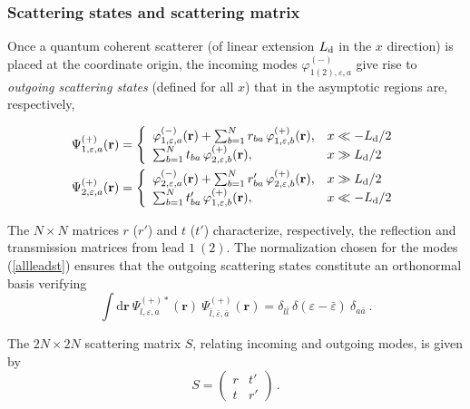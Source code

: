 \documentclass[a4paper,10pt]{article}
\newcommand{\br}{\mathbf{r}}
\newcommand{\dif}{\mathrm{d}}
\newcommand{\nin}{\noindent}
\begin{document}
\subsubsection{Scattering states and scattering matrix}

Once a quantum coherent scatterer (of linear extension $L_{\rm d}$ in the $x$ direction) is placed at the coordinate origin, the incoming modes 
$\varphi_{1(2),\varepsilon,a}^{(-)}$ give rise to {\it outgoing scattering states} (defined for all $x$) that in the asymptotic regions are, respectively,

\begin{subequations}\label{allscats}
\begin{align}
\Psi_{1,\varepsilon,a}^{(+)}(\br) 
&= 
\left\lbrace 
\begin{array}{ll}
\varphi_{1,\varepsilon,a}^{(-)}(\br) + \sum_{b=1}^{N} r_{ba} \, \varphi_{1,\varepsilon,b}^{(+)}(\br),
 & x \ll -L_{\rm d}/2 \\
\sum_{b=1}^{N} t_{ba} \, \varphi_{2,\varepsilon,b}^{(+)}(\br), & x \gg L_{\rm d}/2  
\end{array} 
\right. \label{scatst1} 
\\
\Psi_{2,\varepsilon,a}^{(+)}(\br) 
&= 
\left\lbrace 
\begin{array}{ll}
\varphi_{2,\varepsilon,a}^{(-)}(\br) + \sum_{b=1}^{N} r^{\prime}_{ba} \, 
\varphi_{2,\varepsilon,b}^{(+)}(\br), & x \gg L_{\rm d}/2 \\
\sum_{b=1}^{N} t^{\prime}_{ba} \, \varphi_{1,\varepsilon,b}^{(+)}(\br), & x \ll -L_{\rm d}/2 
\end{array} 
\right. \label{scatst2} 
\end{align}
\end{subequations}

\nin The $N \times N$ matrices $r$ ($r'$) and $t$ ($t'$) characterize, respectively, the reflection and transmission matrices from lead $1\ (2)$.  The normalization chosen for the modes (\ref{allleadst}) ensures that the outgoing scattering states constitute an orthonormal basis verifying
\begin{equation}
\label{state_norm}
\int \dif {\br} \ \Psi_{l,\varepsilon,a}^{(+)*}(\br) \
\Psi_{\bar{l},\bar{\varepsilon},\bar{a}}^{(+)}(\br) = 
\delta_{l \bar{l}} \ \delta(\varepsilon-\bar{\varepsilon}) \ 
\delta_{a \bar{a}} \ .
\end{equation}

\nin The $2N \! \times \! 2N$ scattering matrix $S$, relating 
incoming and outgoing modes, is given by
%
\begin{equation}
\label{eq:scatt_mat}
S = \left( \begin{array}{cc}
r & t' \\
t & r'
\end{array} \right) \, .
\end{equation}
\end{document}

